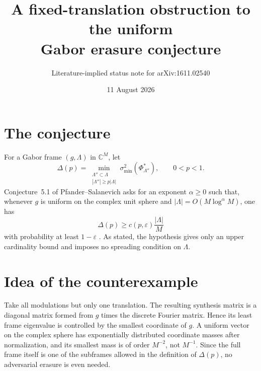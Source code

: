 \documentclass[11pt]{article}
\title{A fixed-translation obstruction to the uniform\\Gabor erasure conjecture}
\author{Literature-implied status note for arXiv:1611.02540}
\date{11 August 2026}
\begin{document}
\maketitle

\begin{center}
\end{center}

\section*{The conjecture}

For a Gabor frame $(g,\Lambda)$ in $\mathbb C^M$, let
\[
 \Delta(p)=\min_{\substack{\Lambda''\subset\Lambda\\
                  |\Lambda''|\geq p|\Lambda|}}
     \sigma_{\min}^2(\Phi_{\Lambda''}^*),
 \qquad 0<p<1.
\]
Conjecture~5.1 of Pfander--Salanevich asks for an exponent $\alpha\geq0$
such that, whenever $g$ is uniform on the complex unit sphere and
$|\Lambda|=O(M\log^\alpha M)$, one has
\[
 \Delta(p)\geq c(p,\varepsilon)\frac{|\Lambda|}{M}
\]
with probability at least $1-\varepsilon$
\cite[Section~5, Conjecture~5.1]{source}.  As stated, the hypothesis gives
only an upper cardinality bound and imposes no spreading condition on
$\Lambda$.

\section*{Idea of the counterexample}

Take all modulations but only one translation.  The resulting synthesis
matrix is a diagonal matrix formed from $g$ times the discrete Fourier
matrix.  Hence its least frame eigenvalue is controlled by the smallest
coordinate of $g$.  A uniform vector on the complex sphere has exponentially
distributed coordinate masses after normalization, and its smallest mass is
of order $M^{-2}$, not $M^{-1}$.  Since the full frame itself is one of the
subframes allowed in the definition of $\Delta(p)$, no adversarial erasure is
even needed.
\end{document}
